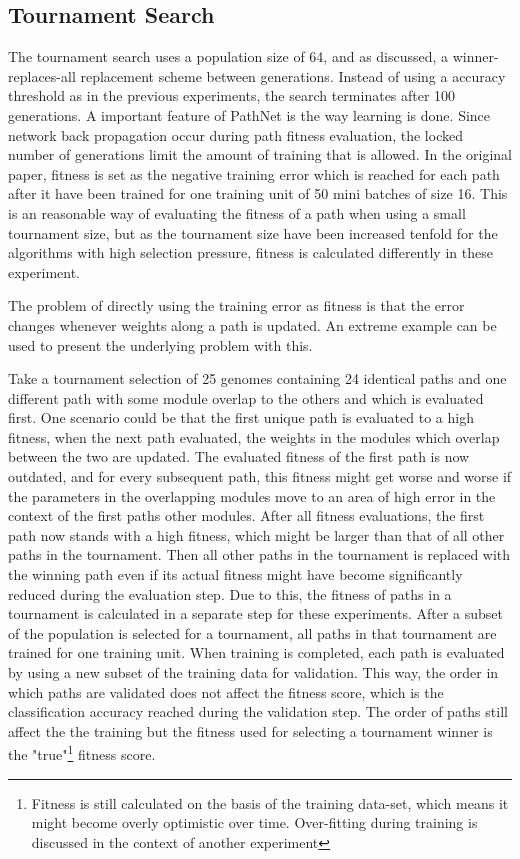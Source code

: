 \subsection{Tournament Search}
The tournament search uses a population size of 64, and as discussed, a winner-replaces-all replacement scheme between generations. Instead of using a accuracy threshold as in the previous experiments, the search terminates after 100 generations. A important feature of PathNet is the way learning is done. Since network back propagation occur during path fitness evaluation, the locked number of generations limit the amount of training that is allowed. In the original paper, fitness is set as the negative training error which is reached for each path after it have been trained for one training unit of 50 mini batches of size 16. This is an reasonable way of evaluating the fitness of a path when using a small tournament size, but as the tournament size have been increased tenfold for the algorithms with high selection pressure, fitness is calculated differently in these experiment. 

The problem of directly using the training error as fitness is that the error changes whenever weights along a path is updated. An extreme example can be used to present the underlying problem with this. 

Take a tournament selection of 25 genomes containing 24 identical paths and one different path with some module overlap to the others and which is evaluated first. One scenario could be that the first unique path is evaluated to a high fitness, when the next path evaluated, the weights in the modules which overlap between the two are updated. The evaluated fitness of the first path is now outdated, and for every subsequent path, this fitness might get worse and worse if the parameters in the overlapping modules move to an area of high error in the context of the first paths other modules. After all fitness evaluations, the first path now stands with a high fitness, which might be larger than that of all other paths in the tournament. Then all other paths in the tournament is replaced with the winning path even if its actual fitness might have become significantly reduced during the evaluation step. Due to this, the fitness of paths in a tournament is calculated in a separate step for these experiments. After a subset of the population is selected for a tournament, all paths in that tournament are trained for one training unit. When training is completed, each path is evaluated by using a new subset of the training data for validation. This way, the order in which paths are validated does not affect the fitness score, which is the classification accuracy reached during the validation step. 
The order of paths still affect the the training but the fitness used for selecting a tournament winner is the "true"\footnote{Fitness is still calculated on the basis of the training data-set, which means it might become overly optimistic over time. Over-fitting during training is discussed in the context of another experiment} fitness score.

